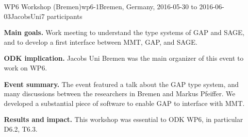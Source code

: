 \begin{event}{WP6 Workshop (Bremen)}{wp6-1}{Bremen, Germany, 2016-05-30 to 2016-06-03}{JacobsUni}{7 participants}{}

\textbf{Main goals.} Work meeting to understand the type systems of GAP and
SAGE, and to develop a first interface between MMT, GAP, and SAGE.

\textbf{ODK implication.} Jacobs Uni Bremen was the main organizer of this
event to work on WP6.

\textbf{Event summary.} The event featured a talk about the GAP type system, and
many discussions between the researchers in Bremen and Markus Pfeiffer. We
developed a substantial piece of software to enable GAP to interface with MMT.

\textbf{Results and impact.} 
This workshop was essential to ODK WP6, in particular D6.2, T6.3.

\end{event}